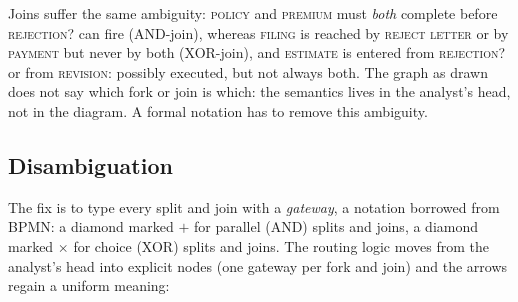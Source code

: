 Joins suffer the same ambiguity: \textsc{policy} and \textsc{premium} must \emph{both} complete before \textsc{rejection?} can fire (AND-join), whereas \textsc{filing} is reached by \textsc{reject letter} or by \textsc{payment} but never by both (XOR-join), and \textsc{estimate} is entered from \textsc{rejection?} or from \textsc{revision}: possibly executed, but not always both.
The graph as drawn does not say which fork or join is which: the semantics lives in the analyst's head, not in the diagram. A formal notation has to remove this ambiguity.

\subsection{Disambiguation}

The fix is to type every split and join with a \emph{gateway}, a notation borrowed from BPMN: a diamond marked $+$ for parallel (AND) splits and joins, a diamond marked $\times$ for choice (XOR) splits and joins. The routing logic moves from the analyst's head into explicit nodes (one gateway per fork and join) and the arrows regain a uniform meaning:

